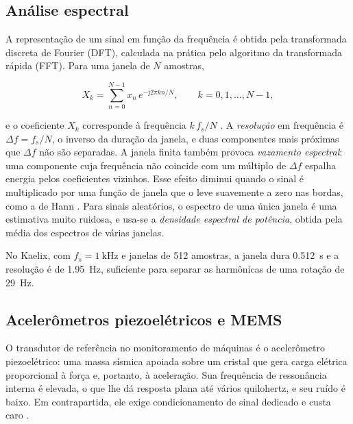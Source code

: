 \subsection{Análise espectral}
\label{sec:fund-espectro}

A representação de um sinal em função da frequência é obtida pela transformada discreta de Fourier (DFT), calculada
na prática pelo algoritmo da transformada rápida (FFT). Para uma janela de $N$ amostras,

\begin{equation}
X_k = \sum_{n=0}^{N-1} x_n\, e^{-\mathrm{j}2\pi k n / N}, \qquad k = 0, 1, \dots, N-1,
\label{eq:fund-dft}
\end{equation}

\noindent
e o coeficiente $X_k$ corresponde à frequência $k\,f_s/N$ \cite{brandt2011}. A \emph{resolução} em frequência é
$\Delta f = f_s/N$, o inverso da duração da janela, e duas componentes mais próximas que $\Delta f$ não são separadas.
A janela finita também provoca \emph{vazamento espectral}: uma componente cuja frequência não coincide com um múltiplo
de $\Delta f$ espalha energia pelos coeficientes vizinhos. Esse efeito diminui quando o sinal é multiplicado por uma
função de janela que o leve suavemente a zero nas bordas, como a de Hann \cite{brandt2011}. Para sinais aleatórios, o
espectro de uma única janela é uma estimativa muito ruidosa, e usa-se a \emph{densidade espectral de potência}, obtida
pela média dos espectros de várias janelas.

No Kaelix, com $f_s = \SI{1}{\kilo\hertz}$ e janelas de \num{512} amostras, a janela dura \SI{0,512}{\second} e a
resolução é de \SI{1,95}{\hertz}, suficiente para separar as harmônicas de uma rotação de \SI{29}{\hertz}.

\subsection{Acelerômetros piezoelétricos e MEMS}

O transdutor de referência no monitoramento de máquinas é o acelerômetro piezoelétrico: uma massa sísmica apoiada sobre
um cristal que gera carga elétrica proporcional à força e, portanto, à aceleração. Sua frequência de ressonância interna
é elevada, o que lhe dá resposta plana até vários quilohertz, e seu ruído é baixo. Em contrapartida, ele exige
condicionamento de sinal dedicado e custa caro \cite{albarbar2008}.

